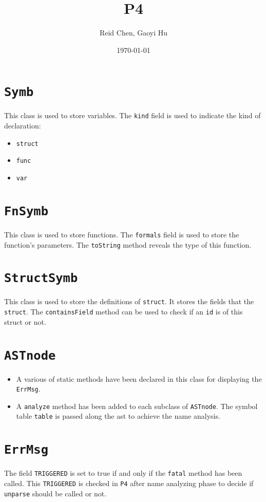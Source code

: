 \documentclass[11pt]{article}
\author{Reid Chen, Gaoyi Hu}
\date{\today}
\title{P4}
\begin{document}
\maketitle
\tableofcontents



\section{\texttt{Symb}}
\label{sec:org6b2ec5d}
This class is used to store variables. The \texttt{kind} field is used to indicate the kind of declaration:
\begin{itemize}
\item \texttt{struct}
\item \texttt{func}
\item \texttt{var}
\end{itemize}
\section{\texttt{FnSymb}}
\label{sec:org1ea01ea}
This class is used to store functions. The \texttt{formals} field is used to store the function's parameters. The \texttt{toString} method reveals the type of this function.
\section{\texttt{StructSymb}}
\label{sec:orgd07dd50}
This class is used to store the definitions of \texttt{struct}. It stores the fields that the \texttt{struct}. The \texttt{containsField} method can be used to check if an \texttt{id} is of this struct or not.
\section{\texttt{ASTnode}}
\label{sec:org68d99ac}
\begin{itemize}
\item A various of static methods have been declared in this class for displaying the \texttt{ErrMsg}.
\item A \texttt{analyze} method has been added to each subclass of \texttt{ASTnode}. The symbol table \texttt{table} is passed along the ast to achieve the name analysis.
\end{itemize}
\section{\texttt{ErrMsg}}
\label{sec:org3cddc0d}
The field \texttt{TRIGGERED} is set to true if and only if the \texttt{fatal} method has been called. This \texttt{TRIGGERED} is checked in \texttt{P4} after name analyzing phase to decide if \texttt{unparse} should be called or not.
\end{document}
